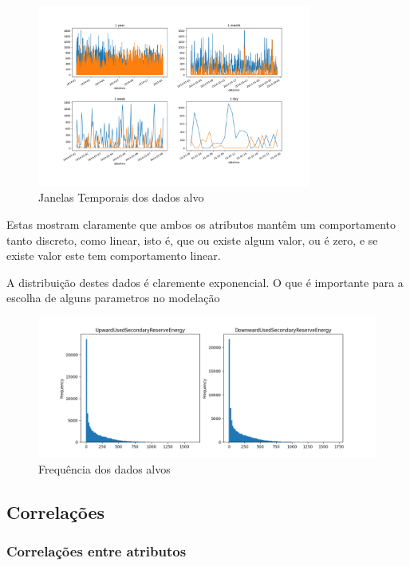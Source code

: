 \begin{figure}[H]
  \centering
  \includegraphics[width=0.8\textwidth]{../plots/target_timeseries_windows.png}
  \caption{Janelas Temporais dos dados alvo}
  \label{fig:target_timeseries_windows}
\end{figure}


Estas mostram claramente que ambos os atributos mantêm um comportamento tanto discreto, como linear, isto é, que ou existe algum valor, ou é zero, e se existe valor este tem comportamento linear.



A distribuição destes dados é claremente exponencial. O que é importante para a escolha de alguns parametros no modelação

		
\begin{figure}[H]
  \centering
  \includegraphics[width=\textwidth]{../plots/target_histograms.png}
  \caption{Frequência dos dados alvos}
\end{figure}


\subsection{Correlações}

\subsubsection{Correlações entre atributos}

